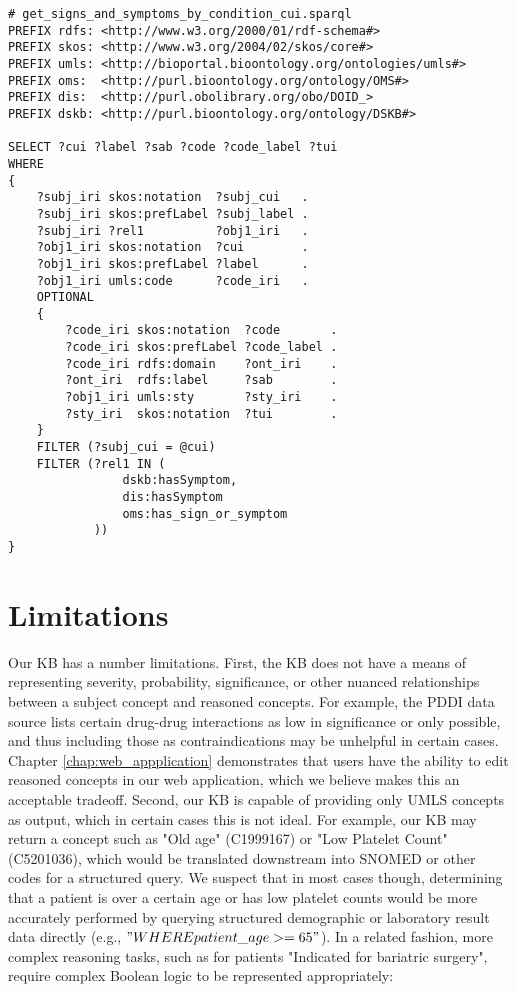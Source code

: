 \documentclass[../main.tex]{subfiles}
\begin{document}
\def\baselinestretch{1.0}    
\begin{lstlisting}
# get_signs_and_symptoms_by_condition_cui.sparql
PREFIX rdfs: <http://www.w3.org/2000/01/rdf-schema#>
PREFIX skos: <http://www.w3.org/2004/02/skos/core#>
PREFIX umls: <http://bioportal.bioontology.org/ontologies/umls#>
PREFIX oms:  <http://purl.bioontology.org/ontology/OMS#>
PREFIX dis:  <http://purl.obolibrary.org/obo/DOID_>
PREFIX dskb: <http://purl.bioontology.org/ontology/DSKB#>

SELECT ?cui ?label ?sab ?code ?code_label ?tui
WHERE 
{
    ?subj_iri skos:notation  ?subj_cui   .
    ?subj_iri skos:prefLabel ?subj_label .
    ?subj_iri ?rel1          ?obj1_iri   .
    ?obj1_iri skos:notation  ?cui        .
    ?obj1_iri skos:prefLabel ?label      .
    ?obj1_iri umls:code      ?code_iri   .
    OPTIONAL
    {
        ?code_iri skos:notation  ?code       .
        ?code_iri skos:prefLabel ?code_label .
        ?code_iri rdfs:domain    ?ont_iri    .
        ?ont_iri  rdfs:label     ?sab        .
        ?obj1_iri umls:sty       ?sty_iri    .
        ?sty_iri  skos:notation  ?tui        .
    }
    FILTER (?subj_cui = @cui) 
    FILTER (?rel1 IN (
                dskb:hasSymptom,
                dis:hasSymptom
                oms:has_sign_or_symptom
            ))
}
\end{lstlisting}
\def\baselinestretch{1.5}    

\section{Limitations}

Our KB has a number limitations. First, the KB does not have a means of representing severity, probability, significance, or other nuanced relationships between a subject concept and reasoned concepts. For example, the PDDI data source lists certain drug-drug interactions as low in significance or only possible, and thus including those as contraindications may be unhelpful in certain cases. Chapter \ref{chap:web_appplication} demonstrates that users have the ability to edit reasoned concepts in our web application, which we believe makes this an acceptable tradeoff. Second, our KB is capable of providing only UMLS concepts as output, which in certain cases this is not ideal. For example, our KB may return a concept such as "Old age" (C1999167) or "Low Platelet Count" (C5201036), which would be translated downstream into SNOMED or other codes for a structured query. We suspect that in most cases though, determining that a patient is over a certain age or has low platelet counts would be more accurately performed by querying structured demographic or laboratory result data directly (e.g., $"WHERE patient\_age >= 65"$). In a related fashion, more complex reasoning tasks, such as for patients "Indicated for bariatric surgery", require complex Boolean logic to be represented appropriately:
\end{document}
